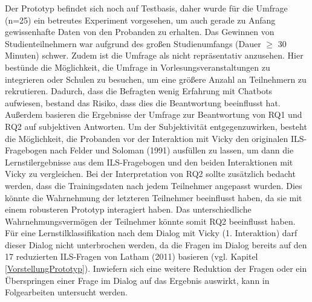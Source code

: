 Der Prototyp befindet sich noch auf Testbasis, daher wurde für die Umfrage (n=25) ein betreutes Experiment vorgesehen, um 
auch gerade zu Anfang gewissenhafte Daten von den Probanden zu erhalten. Das Gewinnen von Studienteilnehmern war aufgrund des 
großen Studienumfangs (Dauer $\geq$ 30 Minuten) schwer. Zudem ist die Umfrage als nicht repräsentativ anzusehen.
Hier bestünde die Möglichkeit, die Umfrage in Vorlesungsveranstaltungen zu integrieren oder Schulen zu besuchen,
um eine größere Anzahl an Teilnehmern zu rekrutieren. 
Dadurch, dass die Befragten wenig Erfahrung mit Chatbots aufwiesen, bestand das Risiko, dass dies die Beantwortung
beeinflusst hat. Außerdem basieren die Ergebnisse der Umfrage zur Beantwortung von RQ1 und RQ2 auf subjektiven Antworten. 
Um der Subjektivität entgegenzuwirken, besteht die Möglichkeit,
die Probanden vor der Interaktion mit Vicky den originalen ILS-Fragebogen nach Felder und Soloman (1991) 
ausfüllen zu lassen, um dann die Lernstilergebnisse aus dem ILS-Fragebogen und den beiden Interaktionen mit Vicky zu vergleichen. 
Bei der Interpretation von RQ2 sollte zusätzlich bedacht werden, dass  
die Trainingsdaten nach jedem Teilnehmer angepasst wurden. Dies könnte die Wahrnehmung der letzteren Teilnehmer beeinflusst haben, da 
sie mit einem robusteren Prototyp interagiert haben. Das unterschiedliche Wahrnehmungsvermögen der Teilnehmer könnte somit RQ2 beeinflusst haben. 
Für eine Lernstilklassifikation nach dem Dialog mit Vicky (1. Interaktion) darf dieser Dialog nicht unterbrochen werden, da die 
Fragen im Dialog bereits auf den 17 reduzierten ILS-Fragen von Latham (2011) basieren (vgl. Kapitel \ref{VorstellungPrototyp}). Inwiefern sich eine weitere Reduktion der Fragen
oder ein Überspringen einer Frage im Dialog auf das Ergebnis auswirkt, kann in Folgearbeiten untersucht werden.

